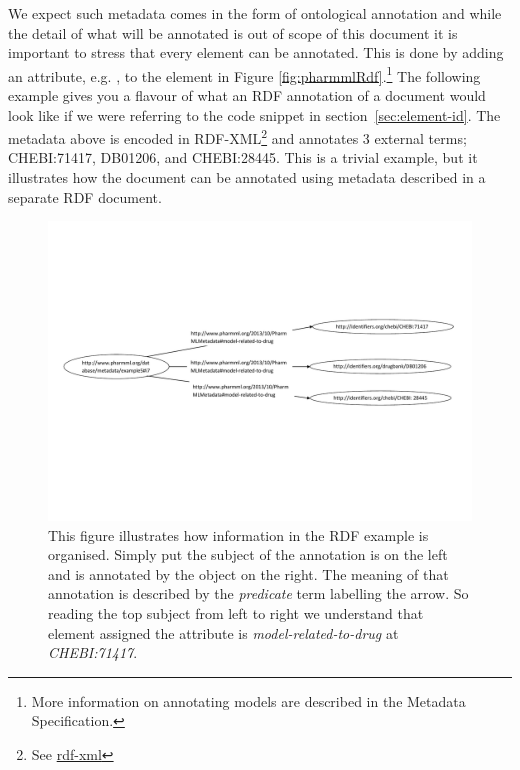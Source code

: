 We expect such metadata comes in the form of ontological annotation and
while the detail of what will be annotated is out of scope of this
document it is important to stress that every \pml element can be annotated. 
This is done by adding an attribute, e.g. , to the 
element in Figure \ref{fig:pharmmlRdf}.\footnote{More information on 
annotating \pharmml models are described in the \pharmml Metadata Specification.} 
The following example gives you a flavour of what an RDF annotation of 
a \pharmml document would look like if we were referring to the code snippet in
section~\ref{sec:element-id}. 
The metadata above is encoded in RDF-XML\footnote{See \url{rdf-xml}}
and annotates 3 external terms; CHEBI:71417, DB01206, and CHEBI:28445.
This is a trivial example, but it
illustrates how the \pharmml document can be annotated using metadata
described in a separate RDF document.

\begin{figure}[htbp]
\centering
\includegraphics[width=0.95\linewidth]{pics/metadatadiagram.pdf}
\caption{This figure illustrates how information in the RDF example is
organised. Simply put the subject of the annotation is on the left and
is annotated by the object on the right. The meaning of that
annotation is described by the \emph{predicate} term labelling the
arrow. So reading the top subject from left to right we understand that
element assigned the attribute  is \emph{model-related-to-drug} at \emph{CHEBI:71417}.}
\label{fig:rdf-graph}
\end{figure}


